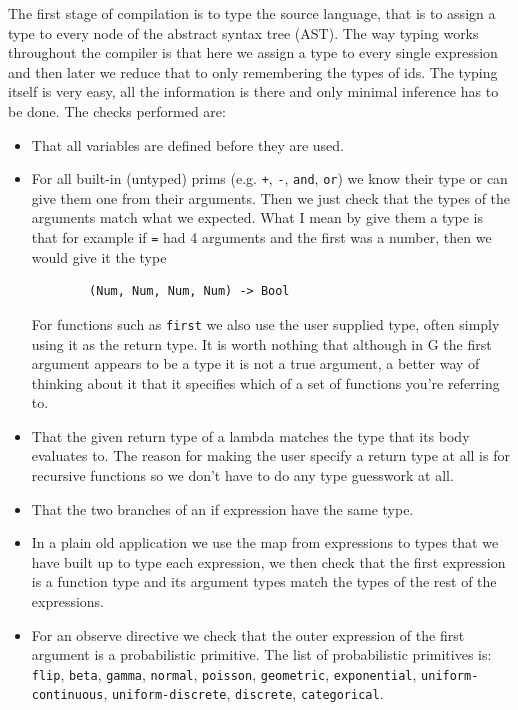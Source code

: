 \documentclass[a4paper]{article}
\begin{document}
The first stage of compilation is to type the source language, that is to assign a type to every node of the abstract syntax tree (AST). The way typing works throughout the compiler is that here we assign a type to every single expression and then later we reduce that to only remembering the types of ids. The typing itself is very easy, all the information is there and only minimal inference has to be done. The checks performed are:
\begin{itemize}
\item
	That all variables are defined before they are used.

\item
	For all built-in (untyped) prims (e.g. \texttt{+}, \texttt{-}, \texttt{and}, \texttt{or}) we know their type or can give them one from their arguments. Then we just check that the types of the arguments match what we expected. What I mean by give them a type is that for example if \texttt{=} had 4 arguments and the first was a number, then we would give it the type
	\begin{verbatim}
		(Num, Num, Num, Num) -> Bool
	\end{verbatim}
	For functions such as \texttt{first} we also use the user supplied type, often simply using it as the return type. It is worth nothing that although in G the first argument appears to be a type it is not a true argument, a better way of thinking about it that it specifies which of a set of functions you're referring to.

\item
	That the given return type of a lambda matches the type that its body evaluates to. The reason for making the user specify a return type at all is for recursive functions so we don't have to do any type guesswork at all.

\item
	That the two branches of an if expression have the same type.

\item
	In a plain old application we use the map from expressions to types that we have built up to type each expression, we then check that the first expression is a function type and its argument types match the types of the rest of the expressions.

\item
	For an observe directive we check that the outer expression of the first argument is a probabilistic primitive. The list of probabilistic primitives is: \texttt{flip}, \texttt{beta}, \texttt{gamma}, \texttt{normal}, \texttt{poisson}, \texttt{geometric}, \texttt{exponential}, \texttt{uniform-continuous}, \texttt{uniform-discrete}, \texttt{discrete}, \texttt{categorical}.

\end{itemize}
\end{document}
